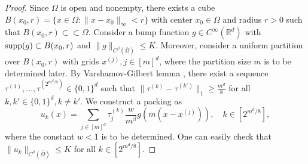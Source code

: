 \documentclass{article}
\newcommand{\R}{\mathbb{R}}
\newcommand{\supp}{\textnormal{supp}}
\theoremstyle{plain}
\theoremstyle{definition}
\theoremstyle{remark}
\begin{document}
\begin{proof}
    Since $\Omega$ is open and nonempty, there exists a cube $B(x_0, r) = \{x \in \Omega: \|x - x_0\|_\infty < r\}$ with center $x_0 \in \Omega$ and radius $r > 0$ such that $B(x_0, r) \subset \subset \Omega$. Consider a bump function $g \in C^\infty(\R^d)$ with $\supp(g) \subset B(x_0, r)$ and $\|g\|_{C^{\beta} (\bar{\Omega})} \leq K$. Moreover, consider a uniform partition over $B(x_0, r)$ with grids $x^{(j)}, j \in [m]^d$, where the partition size $m$ is to be determined later. By Varshamov-Gilbert lemma \cite{Tsybakov2009}, there exist a sequence $\tau^{(1)}, \ldots, \tau^{(2^{m^d/8})} \in \{0, 1\}^d$ such that $\|\tau^{(k)} - \tau^{(k')}\|_1 \geq \frac{m^d}{8}$ for all $k, k' \in \{0, 1\}^d, k \neq k'$. We construct a packing as 
    \begin{equation*}
        u_k(x) = \sum_{j \in [m]^d} \tau^{(k)}_j  \frac{w}{m^{\beta}} g(m (x - x^{(j)})), \quad k \in [2^{m^d/8}],
    \end{equation*}
    where the constant $w < 1$ is to be determined. One can easily check that $\|u_k\|_{C^\beta(\bar{\Omega})} \leq K$ for all $k \in [2^{m^d/8}]$. 


\end{proof}
\end{document}
